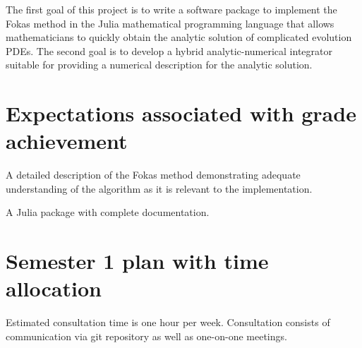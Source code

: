 \documentclass[11pt, oneside, a4paper]{article}
\begin{document}
The first goal of this project is to write a software package to implement the Fokas method in the Julia mathematical programming language that allows mathematicians to quickly obtain the analytic solution of complicated evolution PDEs. The second goal is to develop a hybrid analytic-numerical integrator suitable for providing a numerical description for the analytic solution.

\section{Expectations associated with grade achievement}

A detailed description of the Fokas method demonstrating adequate understanding of the algorithm as it is relevant to the implementation.

\noindent A Julia package with complete documentation.

\section{Semester 1 plan with time allocation}

Estimated consultation time is one hour per week. Consultation consists of communication via git repository as well as one-on-one meetings.

\end{document}
